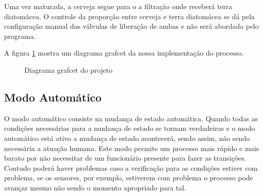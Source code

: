 \documentclass[12pt]{article}
\begin{document}
	Uma vez maturada, a cerveja segue para o a filtração onde receberá terra diatomácea. O controle da proporção entre cerveja e terra diatomácea se dá pela configuração manual das válvulas de liberação de ambas e não será abordada pelo programa.
	
	A figura \ref{fig:grafcet} mostra um diagrama grafcet da nossa implementação do processo.
	
	\begin{figure}[H]
		\centering
		\label{fig:grafcet}
		\caption{Diagrama grafcet do projeto}
	\end{figure}
	
	\subsection{Modo Automático}
	O modo automático consiste na mudança de estado automática. Quando todas as condições necessárias para a mudança de estado se tornam verdadeiras e o modo automático está ativo a mudança de estado acontecerá, sendo assim, não sendo necessária a atuação humana. Este modo permite um processo mais rápido e mais barato por não necessitar de um funcionário presente para fazer as transições. Contudo poderá haver problemas caso a verificação para as condições estiver com problema, se os sensores, por exemplo, estiverem com problema o processo pode avançar mesmo não sendo o momento apropriado para tal.
	
\end{document}
